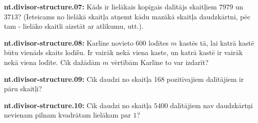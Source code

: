\documentclass[11pt]{article}
\newenvironment{uzdevums}[1][\unskip]{%
\vspace{3mm}
\noindent
\textbf{#1:}
\noindent}
{}
\begin{document}
\begin{uzdevums}[nt.divisor-structure.07]
Kāds ir lielākais kopīgais dalītājs skaitļiem $7979$ un $3713$? (Ieteicams no lielākā skaitļa atņemt kādu mazākā skaitļa 
daudzkārtni, pēc tam - lielāko skaitli aizstāt ar atlikumu, utt.). 
\end{uzdevums}

\begin{uzdevums}[nt.divisor-structure.08]
Karlīne novieto 600 lodītes $m$ kastēs tā, lai katrā kastē būtu vienāds skaits lodīšu. 
Ir vairāk nekā viena kaste, un katrā kastē ir vairāk nekā viena lodīte. 
Cik dažādām $m$ vērtībām Karlīne to var izdarīt? 
\end{uzdevums}

\begin{uzdevums}[nt.divisor-structure.09]
Cik daudzi no skaitļa 168 pozitīvajiem dalītājiem ir pāru skaitļi?
\end{uzdevums}

\begin{uzdevums}[nt.divisor-structure.10]
Cik daudzi no skaitļa $5400$ dalītājiem nav daudzkārtņi nevienam pilnam kvadrātam lielākam par $1$? 
\end{uzdevums}
\end{document}
